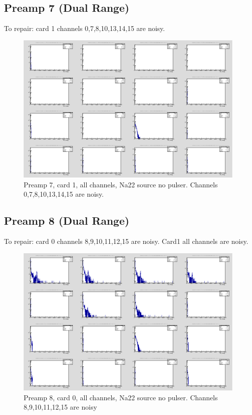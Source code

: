 \documentclass{report}
\begin{document}
\subsection{Preamp 7 (Dual Range)}
To repair: card 1 channels 0,7,8,10,13,14,15 are noisy.
\begin{figure}[!htb]
  \includegraphics[width=\linewidth]{dr_latest_test/preamp7_lim_energy_card1_all_no_pulser.png}
  \caption{Preamp 7, card 1, all channels, Na22 source  no pulser. Channels 0,7,8,10,13,14,15 are noisy.}
\end{figure}

\newpage
\clearpage

\subsection{Preamp 8 (Dual Range)}
To repair: card 0 channels 8,9,10,11,12,15 are noisy. Card1 all channels are noisy.
\begin{figure}[!htb]
  \includegraphics[width=\linewidth]{dr_latest_test/preamp8_lim_energy_card0_all_no_pulser.png}
  \caption{Preamp 8, card 0, all channels, Na22 source  no pulser. Channels 8,9,10,11,12,15 are noisy}
\end{figure}
\end{document}
